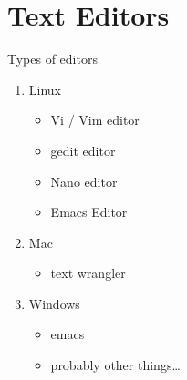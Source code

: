 \documentclass[t,10pt]{beamer}
\begin{document}
\section{Text Editors}
\label{sec:orgheadline14}
\begin{frame}[label={sec:orgheadline5}]{Types of editors}
\begin{enumerate}[<+->]
\item Linux
\begin{itemize}
\item Vi / Vim editor
\item gedit editor
\item Nano editor
\item Emacs Editor
\end{itemize}
\item Mac
\begin{itemize}
\item text wrangler
\end{itemize}
\item Windows
\begin{itemize}
\item emacs
\item probably other things\ldots{}
\end{itemize}
\end{enumerate}
\end{frame}
\end{document}
